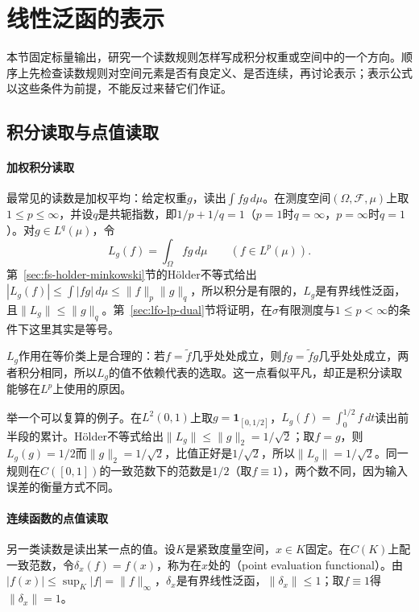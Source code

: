 
\section{线性泛函的表示}
\label{sec:lfo-functional-representation}

本节固定标量输出，研究一个读数规则怎样写成积分权重或空间中的一个方向。顺序上先检查读数规则对空间元素是否有良定义、是否连续，再讨论表示；表示公式以这些条件为前提，不能反过来替它们作证。

\subsection{积分读取与点值读取}
\label{sec:lfo-point-evaluation}

\paragraph{加权积分读取}
最常见的读数是加权平均：给定权重$g$，读出$\int fg\,d\mu$。在测度空间$(\Omega,\mathcal F,\mu)$上取$1\leq p\leq\infty$，并设$q$是共轭指数，即$1/p+1/q=1$（$p=1$时$q=\infty$，$p=\infty$时$q=1$）。对$g\in L^q(\mu)$，令
\begin{equation}
 L_g(f)=\int_\Omega fg\,d\mu\qquad(f\in L^p(\mu)).
 \label{eq:lfo-integral-reading}
\end{equation}
第~\ref{sec:fs-holder-minkowski}节的Hölder不等式给出$|L_g(f)|\leq\int|fg|\,d\mu\leq\|f\|_p\|g\|_q$，所以积分是有限的，$L_g$是有界线性泛函，且$\|L_g\|\leq\|g\|_q$。第~\ref{sec:lfo-lp-dual}节将证明，在$\sigma$有限测度与$1\leq p<\infty$的条件下这里其实是等号。

$L_g$作用在等价类上是合理的：若$f=\tilde f$几乎处处成立，则$fg=\tilde fg$几乎处处成立，两者积分相同，所以$L_g$的值不依赖代表的选取。这一点看似平凡，却正是积分读取能够在$L^p$上使用的原因。

举一个可以复算的例子。在$L^2(0,1)$上取$g=\mathbf 1_{[0,1/2]}$，$L_g(f)=\int_0^{1/2}f\,dt$读出前半段的累计。Hölder不等式给出$\|L_g\|\leq\|g\|_2=1/\sqrt2$；取$f=g$，则$L_g(g)=1/2$而$\|g\|_2=1/\sqrt2$，比值正好是$1/\sqrt2$，所以$\|L_g\|=1/\sqrt2$。同一规则在$C([0,1])$的一致范数下的范数是$1/2$（取$f\equiv1$），两个数不同，因为输入误差的衡量方式不同。

\paragraph{连续函数的点值读取}
另一类读数是读出某一点的值。设$K$是紧致度量空间，$x\in K$固定。在$C(K)$上配一致范数，令$\delta_x(f)=f(x)$，称为在$x$处的（point evaluation functional）。由$|f(x)|\leq\sup_K|f|=\|f\|_\infty$，$\delta_x$是有界线性泛函，$\|\delta_x\|\leq1$；取$f\equiv1$得$\|\delta_x\|=1$。

